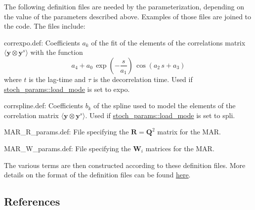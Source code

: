 The following definition files are needed by the parameterization, depending on the value of the parameters described above. Examples of those files are joined to the code. The files include\+:
\begin{DoxyItemize}
\item \textquotesingle{}correxpo.\+def\textquotesingle{}\+: Coefficients $a_k$ of the fit of the elements of the correlations matrix $\langle \boldsymbol y \otimes \boldsymbol y^s \rangle$ with the function \[ a_4+a_0 \, \exp\left(-\frac{s}{a_1}\right) \, \cos(a_2 \, s + a_3) \] where $t$ is the lag-\/time and $\tau$ is the decorrelation time. Used if \hyperlink{namespacestoch__params_ac61a48744a1bb015b5148c421837fbe7}{stoch\+\_\+params\+::load\+\_\+mode} is set to \textquotesingle{}expo\textquotesingle{}.
\item \textquotesingle{}corrspline.\+def\textquotesingle{}\+: Coefficients $b_k$ of the spline used to model the elements of the correlation matrix $\langle \boldsymbol y \otimes \boldsymbol y^s \rangle$. Used if \hyperlink{namespacestoch__params_ac61a48744a1bb015b5148c421837fbe7}{stoch\+\_\+params\+::load\+\_\+mode} is set to \textquotesingle{}spli\textquotesingle{}.
\item \textquotesingle{}M\+A\+R\+\_\+\+R\+\_\+params.\+def\textquotesingle{}\+: File specifying the $\boldsymbol R = \boldsymbol Q^2$ matrix for the M\+AR.
\item \textquotesingle{}M\+A\+R\+\_\+\+W\+\_\+params.\+def\textquotesingle{}\+: File specifying the $\boldsymbol W_i$ matrices for the M\+AR.
\end{DoxyItemize}

The various terms are then constructed according to these definition files. More details on the format of the definition files can be found \hyperlink{md_doc_def_doc}{here}. 



\subsection*{References}



